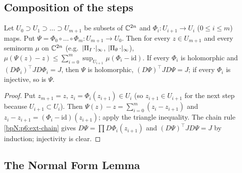 \subsection{Composition of the steps}\label{bpN:p6:s-comp}

\begin{lemma}[Telescoping]\label{bpN:p6:telescope}
Let $U_0\supset U_1\supset\dots\supset U_{m+1}$ be subsets of $\mathbb{C}^{2n}$ and $\Phi_i:U_{i+1}\to U_i$ ($0\le i\le m$) maps. Put $\Psi=\Phi_0\circ\dots\circ\Phi_m:U_{m+1}\to U_0$. Then for every $z\in U_{m+1}$ and every seminorm $\mu$ on $\mathbb{C}^{2n}$ (e.g.\ $\lvert \Pi_I\,\cdot\rvert_\infty$, $\lvert \Pi_\theta\,\cdot\rvert_\infty$), $\mu(\Psi(z)-z)\le\sum_{i=0}^m\sup_{U_{i+1}}\mu(\Phi_i-\mathrm{id})$. If every $\Phi_i$ is holomorphic and $(D\Phi_i)^\top JD\Phi_i=J$, then $\Psi$ is holomorphic, $(D\Psi)^\top JD\Psi=J$; if every $\Phi_i$ is injective, so is $\Psi$.
\end{lemma}
\begin{proof}
\label{stepN:p6:tel} Put $z_{m+1}=z$, $z_i=\Phi_i(z_{i+1})\in U_i$ (so $z_{i+1}\in U_{i+1}$ for the next step because $U_{i+1}\subset U_i$). Then $\Psi(z)-z=\sum_{i=0}^m(z_i-z_{i+1})$ and $z_i-z_{i+1}=(\Phi_i-\mathrm{id})(z_{i+1})$; apply the triangle inequality. The chain rule \ref{bpN:p6:ext-chain} gives $D\Psi=\prod D\Phi_i(z_{i+1})$ and $(D\Psi)^\top JD\Psi=J$ by induction; injectivity is clear.
\end{proof}

\subsection{The Normal Form Lemma}\label{bpN:p6:s-nfl}

